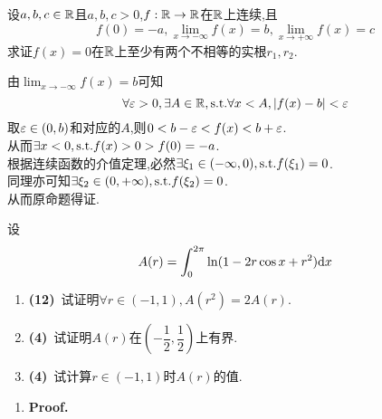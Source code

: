 \documentclass{ctexart}
\begin{document}
\begin{problem}[5.(10\songti{分})]
    设$a,b,c\in\mathbb{R}$且$a,b,c>0$,$f:\mathbb{R}\to\mathbb{R}$在$\mathbb{R}$上连续,且$$f(0)=-a,\lim_{x\to-\infty}f(x)=b,\lim_{x\to+\infty}f(x)=c$$求证$f(x)=0$在$\mathbb{R}$上至少有两个不相等的实根$r_1,r_2$.
\end{problem}
\begin{solution}[Proof.]
    由$\displaystyle\lim_{x\to-\infty}f(x)=b$可知
    $$\forall\varepsilon>0,\exists A\in\mathbb{R},\text{s.t.}\forall x<A,\left|f(x)-b\right|<\varepsilon$$
    取$\varepsilon\in(0,b)$和对应的$A$,则$0<b-\varepsilon<f(x)<b+\varepsilon$.\\
    从而$\exists x<0,\text{s.t.} f(x)>0>f(0)=-a$.\\
    根据连续函数的介值定理,必然$\exists\xi_1\in(-\infty,0),\text{s.t.} f(\xi_1)=0$.\\
    同理亦可知$\exists\xi_2\in(0,+\infty),\text{s.t.} f(\xi_2)=0$.\\
    从而原命题得证.
\end{solution}
\begin{problem}[6.(20\songti{分})]
    设$$A(r)=\int_0^{2\pi}\ln(1-2r\cos x+r^2)\mathrm{d} x$$
    \begin{enumerate}[label=\textbf{(\arabic*)},leftmargin=*]
        \item \textbf{(12)}\ 试证明$\displaystyle\forall r\in(-1,1),A(r^2)=2A(r)$.
        \item \textbf{(4)}\ 试证明$A(r)$在$\left(-\dfrac{1}{2},\dfrac{1}{2}\right)$上有界.
        \item \textbf{(4)}\ 试计算$r\in(-1,1)$时$A(r)$的值.
    \end{enumerate}
\end{problem}
\begin{solution}[Solution]
    \begin{enumerate}[label=\textbf{(\arabic*)},leftmargin=*]
        \item \textbf{Proof.}\\
    \end{enumerate}
\end{solution}
\end{document}
